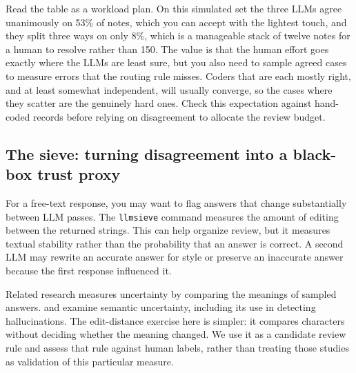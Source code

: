 \documentclass[
    a4paper,
    fontsize=10pt,
    twoside=true,
    numbers=noenddot,
]{kaobook}
\begin{document}
\medskip
Read the table as a workload plan. On this simulated set the three LLMs agree unanimously on 53\% of notes, which you can accept with the lightest touch, and they split three ways on only 8\%, which is a manageable stack of twelve notes for a human to resolve rather than 150. The value is that the human effort goes exactly where the LLMs are least sure, but you also need to sample agreed cases to measure errors that the routing rule misses. Coders that are each mostly right, and at least somewhat independent, will usually converge, so the cases where they scatter are the genuinely hard ones. Check this expectation against hand-coded records before relying on disagreement to allocate the review budget.

\subsection{The sieve: turning disagreement into a black-box trust proxy}\label{sec:sieve}
For a free-text response, you may want to flag answers that change substantially between LLM passes. The \texttt{llmsieve} command measures the amount of editing between the returned strings. This can help organize review, but it measures textual stability rather than the probability that an answer is correct. A second LLM may rewrite an accurate answer for style or preserve an inaccurate answer because the first response influenced it.

Related research measures uncertainty by comparing the meanings of sampled answers. \textcite{kuhn2023semantic} and \textcite{farquhar2024semantic} examine semantic uncertainty, including its use in detecting hallucinations. The edit-distance exercise here is simpler: it compares characters without deciding whether the meaning changed. We use it as a candidate review rule and assess that rule against human labels, rather than treating those studies as validation of this particular measure.
\end{document}
